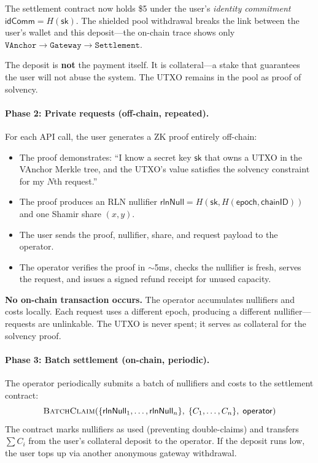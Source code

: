 \documentclass[11pt,a4paper]{article}
\theoremstyle{definition}
\begin{document}
The settlement contract now holds \$5 under the user's \emph{identity commitment} $\mathsf{idComm} = H(\mathsf{sk})$. The shielded pool withdrawal breaks the link between the user's wallet and this deposit---the on-chain trace shows only $\texttt{VAnchor} \to \texttt{Gateway} \to \texttt{Settlement}$.

The deposit is \textbf{not} the payment itself. It is collateral---a stake that guarantees the user will not abuse the system. The UTXO remains in the pool as proof of solvency.

\paragraph{Phase 2: Private requests (off-chain, repeated).}
For each API call, the user generates a ZK proof entirely off-chain:

\begin{itemize}[nosep]
  \item The proof demonstrates: ``I know a secret key $\mathsf{sk}$ that owns a UTXO in the VAnchor Merkle tree, and the UTXO's value satisfies the solvency constraint for my $N$th request.''
  \item The proof produces an RLN nullifier $\mathsf{rlnNull} = H(\mathsf{sk}, H(\mathsf{epoch}, \mathsf{chainID}))$ and one Shamir share $(x, y)$.
  \item The user sends the proof, nullifier, share, and request payload to the operator.
  \item The operator verifies the proof in $\sim$5ms, checks the nullifier is fresh, serves the request, and issues a signed refund receipt for unused capacity.
\end{itemize}

\textbf{No on-chain transaction occurs.} The operator accumulates nullifiers and costs locally. Each request uses a different epoch, producing a different nullifier---requests are unlinkable. The UTXO is never spent; it serves as collateral for the solvency proof.

\paragraph{Phase 3: Batch settlement (on-chain, periodic).}
The operator periodically submits a batch of nullifiers and costs to the settlement contract:
$$\textsc{BatchClaim}(\{\mathsf{rlnNull}_1, \ldots, \mathsf{rlnNull}_n\},\; \{C_1, \ldots, C_n\},\; \mathsf{operator})$$
The contract marks nullifiers as used (preventing double-claims) and transfers $\sum C_i$ from the user's collateral deposit to the operator. If the deposit runs low, the user tops up via another anonymous gateway withdrawal.
\end{document}
